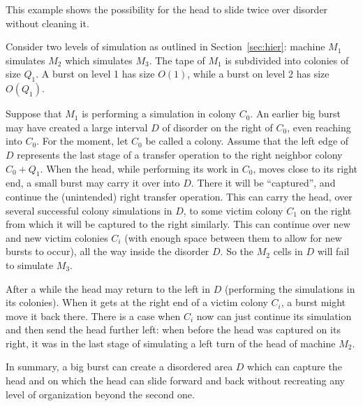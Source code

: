 \documentclass[11pt]{memoir}
\theoremstyle{definition} %
\newcommand{\Q}{Q}
\begin{document}
\begin{example}
  This example shows the possibility for the head to slide twice over disorder without cleaning it.
  
Consider two levels of simulation as outlined in Section~\ref{sec:hier}: 
machine \( M_{1} \) simulates \( M_{2} \) which simulates \( M_{3} \).
The tape of \( M_{1} \) is subdivided into colonies of size \( \Q_{1} \).
A burst on level 1 has size \( O(1) \), while a burst on level 2 has size \( O(\Q_{1}) \).

Suppose that \( M_{1} \) is performing a simulation in colony \( C_{0} \).
An earlier big burst may have created a large interval \( D \) of disorder
on the right of \( C_{0} \), even reaching into \( C_{0} \).
For the moment, let \( C_{0} \) be called a  colony.
Assume that the left edge of \( D \) represents the last stage of a transfer operation to the right neighbor 
colony \( C_{0}+Q_{1} \).
When the head, while performing its work in \( C_{0} \), moves close to its right end, a small burst may 
carry it over into \( D \).
There it will be ``captured'', and continue the (unintended) right transfer operation.
This can carry the head, over several successful colony simulations in \( D \), to some
victim colony \( C_{1} \) on the right from which it will be captured to the right similarly.
This can continue over new and new victim colonies \( C_{i} \) (with enough space between them to allow for
new bursts to occur), all the way inside the disorder \( D \).
So the \( M_{2} \) cells in \( D \) will fail to simulate \( M_{3} \).

After a while the head may return to the left in \( D \)
(performing the simulations in its colonies).
When it gets at the right end of a victim colony \( C_{i} \), a burst might move it back there.
There is a case when \( C_{i} \) now can just continue its simulation and then send the head
further left: when before the head was captured on its right,
it was in the last stage of simulating a left turn of the head of machine \( M_{2} \).

In summary, 
a big burst can create a disordered area \( D \) which can capture the head and on which the head can slide
forward and back without recreating any level of organization beyond the second one.
\end{example}
\end{document}
